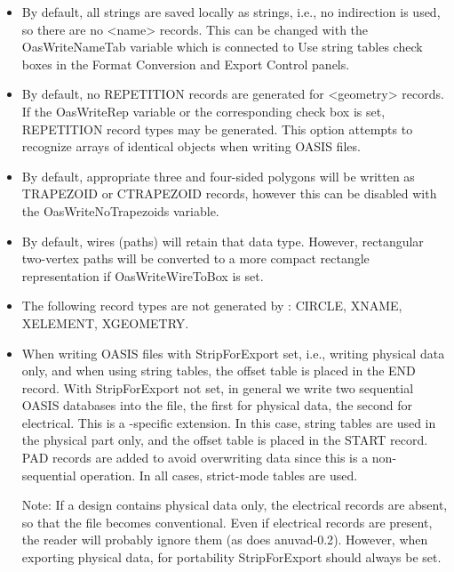 \begin{itemize}
\item{By default, all strings are saved locally as strings, i.e., no
indirection is used, so there are no {\vt <name>} records.  This can
be changed with the {\et OasWriteNameTab} variable which is connected
to {\cb Use string tables} check boxes in the {\cb Format Conversion}
and {\cb Export Control} panels.}

\item{By default, no REPETITION records are generated for {\vt
<geometry>} records.  If the {\et OasWriteRep} variable or the
corresponding check box is set, REPETITION record types may be
generated.  This option attempts to recognize arrays of identical
objects when writing OASIS files.}

\item{By default, appropriate three and four-sided polygons will be
written as TRAPEZOID or CTRAPEZOID records, however this can be
disabled with the {\et OasWriteNoTrapezoids} variable.}

\item{By default, wires (paths) will retain that data type.  However,
rectangular two-vertex paths will be converted to a more compact
rectangle representation if {\et OasWriteWireToBox} is set.}

\item{The following record types are not generated by {\Xic}: 
CIRCLE, XNAME, XELEMENT, XGEOMETRY.}

\item{When writing OASIS files with {\et StripForExport} set, i.e.,
writing physical data only, and when using string tables, the offset
table is placed in the END record.  With {\et StripForExport} not set,
in general we write two sequential OASIS databases into the file, the
first for physical data, the second for electrical.  This is a
{\Xic}-specific extension.  In this case, string tables are used in
the physical part only, and the offset table is placed in the START
record.  PAD records are added to avoid overwriting data since this is
a non-sequential operation.  In all cases, strict-mode tables are
used.

Note:  If a design contains physical data only, the electrical records
are absent, so that the file becomes conventional.  Even if electrical
records are present, the reader will probably ignore them (as does
{\vt anuvad-0.2}).  However, when exporting physical data, for
portability {\et StripForExport} should always be set.

}
\end{itemize}

